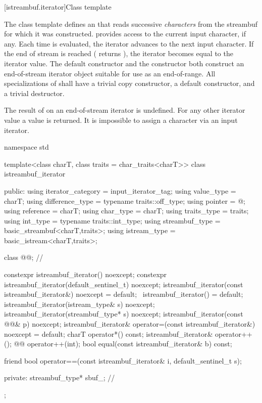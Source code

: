 [istreambuf.iterator]{Class template }

\pnum
The
class template
defines an  that
reads successive
\textit{characters}
from the streambuf for which it was constructed.
provides access to the current input character, if any.
Each time
is evaluated, the iterator advances to the next input character.
If the end of stream is reached ( returns
),
the iterator becomes equal to the
iterator value.
The default constructor
and the constructor
both construct an end-of-stream iterator object suitable for use
as an end-of-range.
All specializations of  shall have a trivial copy
constructor, a  default constructor, and a trivial destructor.

\pnum
The result of
on an end-of-stream iterator is undefined.
%
For any other iterator value a
value is returned.
It is impossible to assign a character via an input iterator.

%
\begin{codeblock}
namespace std {
  template<class charT, class traits = char_traits<charT>>
  class istreambuf_iterator {
  public:
    using iterator_category = input_iterator_tag;
    using value_type        = charT;
    using difference_type   = typename traits::off_type;
    using pointer           = @\unspec@;
    using reference         = charT;
    using char_type         = charT;
    using traits_type       = traits;
    using int_type          = typename traits::int_type;
    using streambuf_type    = basic_streambuf<charT,traits>;
    using istream_type      = basic_istream<charT,traits>;

    class @@;                          // \expos

    constexpr istreambuf_iterator() noexcept;
    constexpr istreambuf_iterator(default_sentinel_t) noexcept;
    istreambuf_iterator(const istreambuf_iterator&) noexcept = default;
    ~istreambuf_iterator() = default;
    istreambuf_iterator(istream_type& s) noexcept;
    istreambuf_iterator(streambuf_type* s) noexcept;
    istreambuf_iterator(const @@& p) noexcept;
    istreambuf_iterator& operator=(const istreambuf_iterator&) noexcept = default;
    charT operator*() const;
    istreambuf_iterator& operator++();
    @@ operator++(int);
    bool equal(const istreambuf_iterator& b) const;

    friend bool operator==(const istreambuf_iterator& i, default_sentinel_t s);

  private:
    streambuf_type* sbuf_;              // \expos
  };
}
\end{codeblock}

